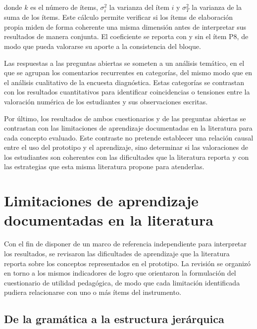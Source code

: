 donde $k$ es el número de ítems, $\sigma_i^2$ la varianza del ítem $i$ y $\sigma_T^2$ la varianza de la suma de los ítems. Este cálculo permite verificar si los ítems de elaboración propia miden de forma coherente una misma dimensión antes de interpretar sus resultados de manera conjunta. El coeficiente se reporta con y sin el ítem P8, de modo que pueda valorarse su aporte a la consistencia del bloque.

Las respuestas a las preguntas abiertas se someten a un análisis temático, en el que se agrupan los comentarios recurrentes en categorías, del mismo modo que en el análisis cualitativo de la encuesta diagnóstica. Estas categorías se contrastan con los resultados cuantitativos para identificar coincidencias o tensiones entre la valoración numérica de los estudiantes y sus observaciones escritas.

Por último, los resultados de ambos cuestionarios y de las preguntas abiertas se contrastan con las limitaciones de aprendizaje documentadas en la literatura para cada concepto evaluado. Este contraste no pretende establecer una relación causal entre el uso del prototipo y el aprendizaje, sino determinar si las valoraciones de los estudiantes son coherentes con las dificultades que la literatura reporta y con las estrategias que esta misma literatura propone para atenderlas.

\section{Limitaciones de aprendizaje documentadas en la literatura}
\label{sec:eval-literatura}

Con el fin de disponer de un marco de referencia independiente para interpretar los resultados, se revisaron las dificultades de aprendizaje que la literatura reporta sobre los conceptos representados en el prototipo. La revisión se organizó en torno a los mismos indicadores de logro que orientaron la formulación del cuestionario de utilidad pedagógica, de modo que cada limitación identificada pudiera relacionarse con uno o más ítems del instrumento.

\subsection{De la gramática a la estructura jerárquica}

